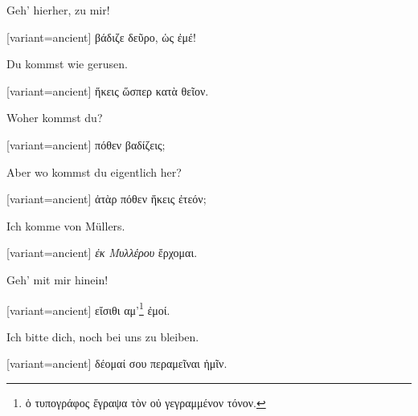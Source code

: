 Geh' hierher, zu mir!

\switchcolumn

\begin{greek}[variant=ancient]%
βάδιζε δεῦρο, ὡς ἐμέ!

\end{greek}%
\switchcolumn*

Du kommst wie gerusen.

\switchcolumn

\begin{greek}[variant=ancient]%
ἥκεις ὥσπερ κατὰ θεῖον.

\end{greek}%
\switchcolumn*

Woher kommst du?

\switchcolumn

\begin{greek}[variant=ancient]%
πόθεν βαδίζεις;

\end{greek}%
\switchcolumn*

Aber wo kommst du eigentlich her?

\switchcolumn

\begin{greek}[variant=ancient]%
ἀτὰρ πόθεν ἥκεις ἐτεόν;

\end{greek}%
\switchcolumn*

Ich komme von Müllers.

\switchcolumn

\begin{greek}[variant=ancient]%
\emph{ἐκ Μυλλέρου} ἔρχομαι.

\end{greek}%
\switchcolumn*

Geh' mit mir hinein!

\switchcolumn

\begin{greek}[variant=ancient]%
εἴσιθι αμ'\footnote{ὁ τυπογράφος ἔγραψα τὸν οὐ γεγραμμένον τόνον.}
ἐμοί.

\end{greek}%
\switchcolumn*

Ich bitte dich, noch bei uns zu bleiben.

\switchcolumn

\begin{greek}[variant=ancient]%
δέομαί σου περαμεῖναι ἡμῖν.

\end{greek}%
\switchcolumn*

